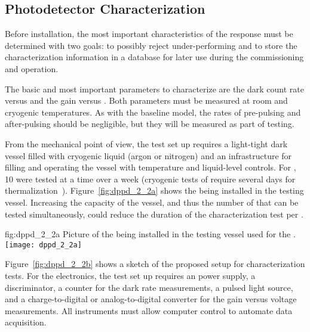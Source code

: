 \subsection{Photodetector Characterization}
\label{sec:dp-pds-selection-characterization}

Before installation, the most important characteristics of the  response must be determined with two goals: to possibly reject under-performing  and to store the characterization information in a database for later use during the  commissioning and operation.

The basic and most important parameters to characterize are the dark count rate versus  and the gain versus . Both parameters must be measured at room and cryogenic temperatures. As with the baseline  model, the rates of pre-pulsing and after-pulsing should be negligible, but they will be measured as part of testing. 

From the mechanical point of view, the test set up requires a light-tight dark vessel filled with cryogenic liquid (argon or nitrogen) and an infrastructure for filling and operating the vessel with temperature and liquid-level controls. For , \num{10}  were tested at a time over a week (cryogenic tests of  require several days for  thermalization~\cite{Belver:2018erf}). Figure~\ref{fig:dppd_2_2a} shows the    being installed in the testing vessel.
Increasing the capacity of the vessel, and thus the number of  that can be tested simultaneously,
could reduce the duration of the characterization test per .

\begin{dunefigure}{fig:dppd_2_2a}
{Picture of the  being installed in the testing vessel used for the  .}
\texttt{[image: dppd\_2\_2a]}
\end{dunefigure}

Figure~\ref{fig:dppd_2_2b} shows a sketch of the proposed setup for  characterization tests. For the electronics, the test set up requires an  power supply, a discriminator, a counter for the dark rate measurements, a pulsed light source, and a charge-to-digital or analog-to-digital converter for the  gain versus voltage measurements. All instruments must allow computer control to automate data acquisition.

